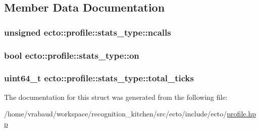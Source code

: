 \subsection{Member Data Documentation}
\hypertarget{structecto_1_1profile_1_1stats__type_a570c8df89c2318ab98757e29670ba70b}{
\subsubsection[{ncalls}]{\setlength{\rightskip}{0pt plus 5cm}unsigned ecto\-::profile\-::stats\-\_\-type\-::ncalls}}\label{structecto_1_1profile_1_1stats__type_a570c8df89c2318ab98757e29670ba70b}
\hypertarget{structecto_1_1profile_1_1stats__type_a25c84366176dc49eb9b113a4e74c6b5a}{
\subsubsection[{on}]{\setlength{\rightskip}{0pt plus 5cm}bool ecto\-::profile\-::stats\-\_\-type\-::on}}\label{structecto_1_1profile_1_1stats__type_a25c84366176dc49eb9b113a4e74c6b5a}
\hypertarget{structecto_1_1profile_1_1stats__type_affa2973693dec71733bcf8f7b6cf9c0b}{
\subsubsection[{total\-\_\-ticks}]{\setlength{\rightskip}{0pt plus 5cm}uint64\-\_\-t ecto\-::profile\-::stats\-\_\-type\-::total\-\_\-ticks}}\label{structecto_1_1profile_1_1stats__type_affa2973693dec71733bcf8f7b6cf9c0b}


The documentation for this struct was generated from the following file\-:\begin{DoxyCompactItemize}
\item 
/home/vrabaud/workspace/recognition\-\_\-kitchen/src/ecto/include/ecto/\hyperlink{profile_8hpp}{profile.\-hpp}\end{DoxyCompactItemize}
